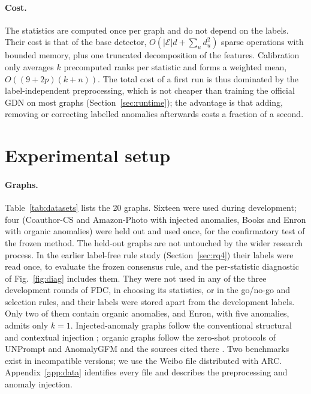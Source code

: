 \documentclass[pdflatex,sn-mathphys-ay]{sn-jnl}
\theoremstyle{plain}
\theoremstyle{remark}
\begin{document}
\paragraph{Cost.} The statistics are computed once per graph and do not depend on the labels. Their cost is that of the base detector, $O(|\mathcal{E}|d+\sum_u d_u^2)$ sparse operations with bounded memory, plus one truncated decomposition of the features. Calibration only averages $k$ precomputed ranks per statistic and forms a weighted mean, $O((9+2p)(k+n))$. The total cost of a first run is thus dominated by the label-independent preprocessing, which is not cheaper than training the official GDN on most graphs (Section~\ref{sec:runtime}); the advantage is that adding, removing or correcting labelled anomalies afterwards costs a fraction of a second.

\section{Experimental setup}\label{sec:setup}

\paragraph{Graphs.} Table~\ref{tab:datasets} lists the 20 graphs. Sixteen were used during development; four (Coauthor-CS and Amazon-Photo with injected anomalies, Books and Enron with organic anomalies) were held out and used once, for the confirmatory test of the frozen method. The held-out graphs are not untouched by the wider research process. In the earlier label-free rule study (Section~\ref{sec:rq4}) their labels were read once, to evaluate the frozen consensus rule, and the per-statistic diagnostic of Fig.~\ref{fig:diag} includes them. They were not used in any of the three development rounds of FDC, in choosing its statistics, or in the go/no-go and selection rules, and their labels were stored apart from the development labels. Only two of them contain organic anomalies, and Enron, with five anomalies, admits only $k=1$. Injected-anomaly graphs follow the conventional structural and contextual injection \citep{ding2019deep,liu2021cola,xu2022contrastive}; organic graphs follow the zero-shot protocols of UNPrompt and AnomalyGFM \citep{niu2025unprompt,qiao2025anomalygfm} and the sources cited there \citep{kumar2019predicting,mcauley2013amateurs,dou2020enhancing,sanchez2013statistical,zhao2020error,platonov2023critical,rayana2015collective,shchur2018pitfalls}. Two benchmarks exist in incompatible versions; we use the Weibo file distributed with ARC. Appendix~\ref{app:data} identifies every file and describes the preprocessing and anomaly injection.
\end{document}
